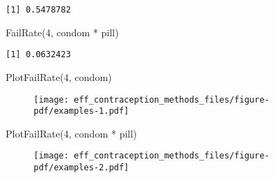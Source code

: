 \documentclass[
  letterpaper,
  DIV=11,
  numbers=noendperiod]{scrartcl}
\newenvironment{Shaded}{\begin{snugshade}}{\end{snugshade}}
\newcommand{\DecValTok}[1]{\textcolor[rgb]{0.68,0.00,0.00}{#1}}
\newcommand{\FunctionTok}[1]{\textcolor[rgb]{0.28,0.35,0.67}{#1}}
\newcommand{\NormalTok}[1]{\textcolor[rgb]{0.00,0.46,0.62}{#1}}
\newcommand{\SpecialCharTok}[1]{\textcolor[rgb]{0.37,0.37,0.37}{#1}}
\begin{document}
\begin{verbatim}
[1] 0.5478782
\end{verbatim}

\begin{Shaded}
\begin{Highlighting}[]
\FunctionTok{FailRate}\NormalTok{(}\DecValTok{4}\NormalTok{, condom }\SpecialCharTok{*}\NormalTok{ pill)}
\end{Highlighting}
\end{Shaded}

\begin{verbatim}
[1] 0.0632423
\end{verbatim}

\begin{Shaded}
\begin{Highlighting}[]
\FunctionTok{PlotFailRate}\NormalTok{(}\DecValTok{4}\NormalTok{, condom)}
\end{Highlighting}
\end{Shaded}

\begin{figure}[H]

{\centering \texttt{[image: eff\_contraception\_methods\_files/figure-pdf/examples-1.pdf]}

}

\end{figure}

\begin{Shaded}
\begin{Highlighting}[]
\FunctionTok{PlotFailRate}\NormalTok{(}\DecValTok{4}\NormalTok{, condom }\SpecialCharTok{*}\NormalTok{ pill)}
\end{Highlighting}
\end{Shaded}

\begin{figure}[H]

{\centering \texttt{[image: eff\_contraception\_methods\_files/figure-pdf/examples-2.pdf]}

}

\end{figure}
\end{document}
